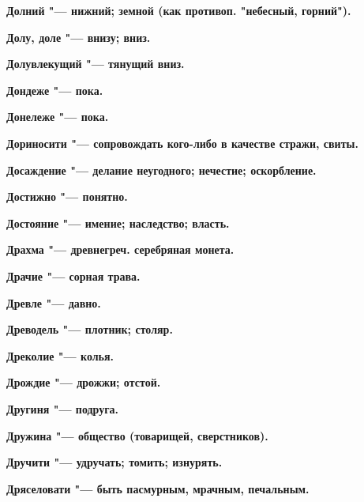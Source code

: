 \bfseries Долний \normalfont{} "--- нижний; земной (как противоп. "небесный, горний"). 




\bfseries Долу, доле \normalfont{} "--- внизу; вниз. 




\bfseries Долувлекущий \normalfont{} "--- тянущий вниз. 




\bfseries Дондеже \normalfont{} "--- пока. 




\bfseries Донележе \normalfont{} "--- пока. 




\bfseries Дориносити \normalfont{} "--- сопровождать кого-либо в качестве стражи, свиты. 




\bfseries Досаждение \normalfont{} "--- делание неугодного; нечестие; оскорбление. 




\bfseries Достижно \normalfont{} "--- понятно. 




\bfseries Достояние \normalfont{} "--- имение; наследство; власть. 




\bfseries Драхма \normalfont{} "--- древнегреч. серебряная монета. 




\bfseries Драчие \normalfont{} "--- сорная трава. 




\bfseries Древле \normalfont{} "--- давно. 




\bfseries Древодель \normalfont{} "--- плотник; столяр. 




\bfseries Дреколие \normalfont{} "--- колья. 




\bfseries Дрождие \normalfont{} "--- дрожжи; отстой. 




\bfseries Другиня \normalfont{} "--- подруга. 




\bfseries Дружина \normalfont{} "--- общество (товарищей, сверстников). 




\bfseries Дручити \normalfont{} "--- удручать; томить; изнурять. 




\bfseries Дряселовати \normalfont{} "--- быть пасмурным, мрачным, печальным. 




